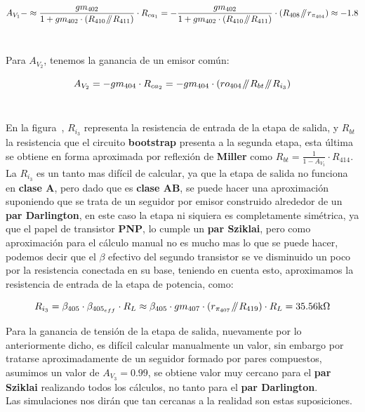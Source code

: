 \begin{equation}
A_{V_{1}} -\approx \frac{gm_{402}}{1 + gm_{402} \cdot \left( R_{410} \parallelresistors R_{411}\right) } \cdot R_{ca_{1}} = -\frac{gm_{402}}{1 + gm_{402} \cdot \left( R_{410} \parallelresistors R_{411}\right) } \cdot \left( R_{408} \parallelresistors r_{\pi_{404}} \right) \approx -1.8
\end{equation}\\


\begin{sloppypar}
Para $A_{V_{2}}$, tenemos la ganancia de un emisor común: 
\end{sloppypar}


\begin{equation}
A_{V_{2}} = -gm_{404} \cdot R_{ca_{2}} = -gm_{404} \cdot \left(  r{o_{404}} \parallelresistors R_{bt} \parallelresistors R_{i_{3}}  \right)
\end{equation}\\


\begin{sloppypar}
En la figura~, $R_{i_{3}}$ representa la resistencia de entrada de la etapa de salida, y $R_{bt}$ la resistencia que el circuito \mbox{\textbf{bootstrap}} presenta a la segunda etapa, esta última se obtiene en forma aproximada por reflexión de \mbox{\textbf{Miller}} como $R_{bt} = \frac{1}{1 - A_{V_{3}}} \cdot R_{414} $.
La $R_{i_{3}}$ es un tanto mas difícil de calcular, ya que la etapa de salida no funciona en \textbf{clase A}, pero dado que es \textbf{clase AB}, se puede hacer una aproximación suponiendo que se trata de un seguidor por emisor construido alrededor de un \textbf{par Darlington}, en este caso la etapa ni siquiera es completamente simétrica, ya que el papel de transistor \textbf{PNP}, lo cumple un \textbf{par Sziklai}, pero como aproximación para el cálculo manual no es mucho mas lo que se puede hacer, podemos decir que el $\beta$ efectivo del segundo transistor se ve disminuido un poco por la resistencia conectada en su base, teniendo en cuenta esto, aproximamos la resistencia de entrada de la etapa de potencia, como:

\begin{equation*}
R_{i_{3}} = \beta_{405} \cdot \beta_{405_{eff}} \cdot R_{L} \approx \beta_{405} \cdot gm_{407} \cdot \left( r_{\pi_{407}} \parallelresistors R_{419} \right) \cdot R_{L} = 35.56 \si[per-mode=symbol]{\kilo\ohm}
\end{equation*}

Para la ganancia de tensión de la etapa de salida, nuevamente por lo anteriormente dicho, es difícil calcular manualmente un valor, sin embargo por tratarse aproximadamente de un seguidor formado por pares compuestos, asumimos un valor de $A_{V_{3}} = 0.99$, se obtiene valor muy cercano para el \textbf{par Sziklai} realizando todos los cálculos, no tanto para el \textbf{par Darlington}.\\

Las simulaciones nos dirán que tan cercanas a la realidad son estas suposiciones.

\end{sloppypar}


